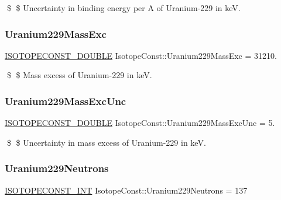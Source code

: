 \$ \$ Uncertainty in binding energy per A of Uranium-\/229 in keV. \mbox{\label{group___isotope_const-_uranium-_u229_gab158a1851ca0c60764cc1b27b36971eb}} 
\subsubsection{\texorpdfstring{Uranium229\+Mass\+Exc}{Uranium229MassExc}}
{\footnotesize\ttfamily \mbox{\hyperlink{group___isotope_const-_macros_ga8f45a7272ce02c0b4c65c44636ed719a}{I\+S\+O\+T\+O\+P\+E\+C\+O\+N\+S\+T\+\_\+\+D\+O\+U\+B\+LE}} Isotope\+Const\+::\+Uranium229\+Mass\+Exc = 31210.}

\$ \$ Mass excess of Uranium-\/229 in keV. \mbox{\label{group___isotope_const-_uranium-_u229_ga4df4ffcd8267d8c575e4ed6a5eaf48ff}} 
\subsubsection{\texorpdfstring{Uranium229\+Mass\+Exc\+Unc}{Uranium229MassExcUnc}}
{\footnotesize\ttfamily \mbox{\hyperlink{group___isotope_const-_macros_ga8f45a7272ce02c0b4c65c44636ed719a}{I\+S\+O\+T\+O\+P\+E\+C\+O\+N\+S\+T\+\_\+\+D\+O\+U\+B\+LE}} Isotope\+Const\+::\+Uranium229\+Mass\+Exc\+Unc = 5.}

\$ \$ Uncertainty in mass excess of Uranium-\/229 in keV. \mbox{\label{group___isotope_const-_uranium-_u229_ga48ef93a1c8811b3a1bc7760d553c3aa3}} 
\subsubsection{\texorpdfstring{Uranium229\+Neutrons}{Uranium229Neutrons}}
{\footnotesize\ttfamily \mbox{\hyperlink{group___isotope_const-_macros_ga5f18360b3e99483a35c32d789e62621c}{I\+S\+O\+T\+O\+P\+E\+C\+O\+N\+S\+T\+\_\+\+I\+NT}} Isotope\+Const\+::\+Uranium229\+Neutrons = 137}

